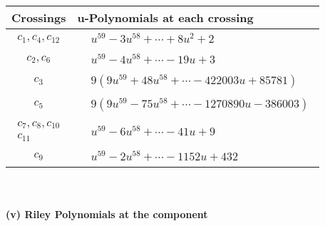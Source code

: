 \documentclass[1p]{elsarticle_modified}
\theoremstyle{definition}
\begin{document}
\begin{tabular}{m{50pt}|m{274pt}}
Crossings & \hspace{64pt}u-Polynomials at each crossing \\
\hline $$\begin{aligned}c_{1},c_{4},c_{12}\end{aligned}$$&$\begin{aligned}
&u^{59}-3 u^{58}+\cdots+8 u^2+2
\end{aligned}$\\
\hline $$\begin{aligned}c_{2},c_{6}\end{aligned}$$&$\begin{aligned}
&u^{59}-4 u^{58}+\cdots-19 u+3
\end{aligned}$\\
\hline $$\begin{aligned}c_{3}\end{aligned}$$&$\begin{aligned}
&9(9 u^{59}+48 u^{58}+\cdots-422003 u+85781)
\end{aligned}$\\
\hline $$\begin{aligned}c_{5}\end{aligned}$$&$\begin{aligned}
&9(9 u^{59}-75 u^{58}+\cdots-1270890 u-386003)
\end{aligned}$\\
\hline $$\begin{aligned}c_{7},c_{8},c_{10}\\c_{11}\end{aligned}$$&$\begin{aligned}
&u^{59}-6 u^{58}+\cdots-41 u+9
\end{aligned}$\\
\hline $$\begin{aligned}c_{9}\end{aligned}$$&$\begin{aligned}
&u^{59}-2 u^{58}+\cdots-1152 u+432
\end{aligned}$\\
\hline
\end{tabular}\\~\\
\newpage\renewcommand{\arraystretch}{1}
\flushleft \textbf{(v) Riley Polynomials at the component}\newline \\
\end{document}
